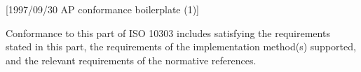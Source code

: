 [1997/09/30 AP conformance boilerplate (1)]

  Conformance to this part of ISO 10303 includes satisfying
the requirements stated in this part, the requirements of
the implementation method(s) supported, and the relevant
requirements of the normative references.

\endinput
